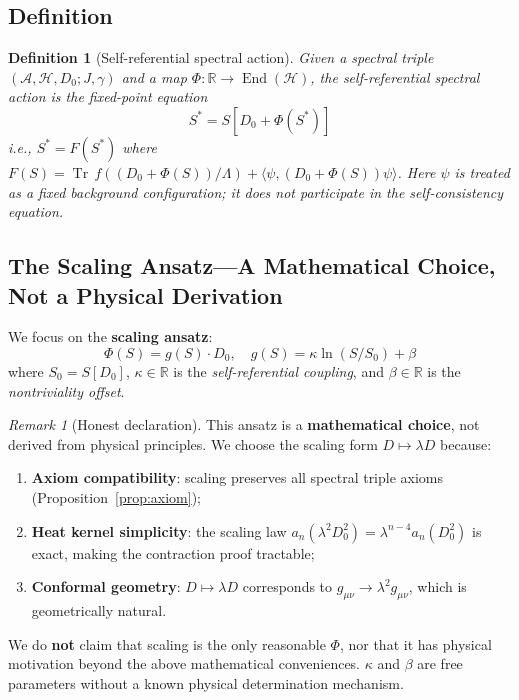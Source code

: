 \documentclass[11pt,a4paper]{article}
\newtheorem{definition}[theorem]{Definition}
\theoremstyle{remark}
\newtheorem{remark}[theorem]{Remark}
\providecommand{\Tr}{\operatorname{Tr}}
\newcommand{\End}{\operatorname{End}}
\begin{document}
\subsection{Definition}

\begin{definition}[Self-referential spectral action]
Given a spectral triple $(\mathcal{A}, \mathcal{H}, D_0; J, \gamma)$ and a map $\Phi: \mathbb{R} \to \End(\mathcal{H})$, the self-referential spectral action is the fixed-point equation
\[
  S^* = S[D_0 + \Phi(S^*)]
\]
i.e., $S^* = F(S^*)$ where $F(S) = \Tr\, f((D_0 + \Phi(S))/\Lambda) + \langle\psi, (D_0 + \Phi(S))\psi\rangle$. Here $\psi$ is treated as a fixed background configuration; it does not participate in the self-consistency equation.
\end{definition}

\subsection{The Scaling Ansatz---A Mathematical Choice, Not a Physical Derivation}

We focus on the \textbf{scaling ansatz}:
\[
  \Phi(S) = g(S) \cdot D_0, \quad g(S) = \kappa \ln(S/S_0) + \beta
\]
where $S_0 = S[D_0]$, $\kappa \in \mathbb{R}$ is the \emph{self-referential coupling}, and $\beta \in \mathbb{R}$ is the \emph{nontriviality offset}.

\begin{remark}[Honest declaration]
This ansatz is a \textbf{mathematical choice}, not derived from physical principles. We choose the scaling form $D \mapsto \lambda D$ because:
\begin{enumerate}
  \item \textbf{Axiom compatibility}: scaling preserves all spectral triple axioms (Proposition~\ref{prop:axiom});
  \item \textbf{Heat kernel simplicity}: the scaling law $a_n(\lambda^2 D_0^2) = \lambda^{n-4} a_n(D_0^2)$ is exact, making the contraction proof tractable;
  \item \textbf{Conformal geometry}: $D \mapsto \lambda D$ corresponds to $g_{\mu\nu} \to \lambda^2 g_{\mu\nu}$, which is geometrically natural.
\end{enumerate}
We do \textbf{not} claim that scaling is the only reasonable $\Phi$, nor that it has physical motivation beyond the above mathematical conveniences. $\kappa$ and $\beta$ are free parameters without a known physical determination mechanism.
\end{remark}
\end{document}
